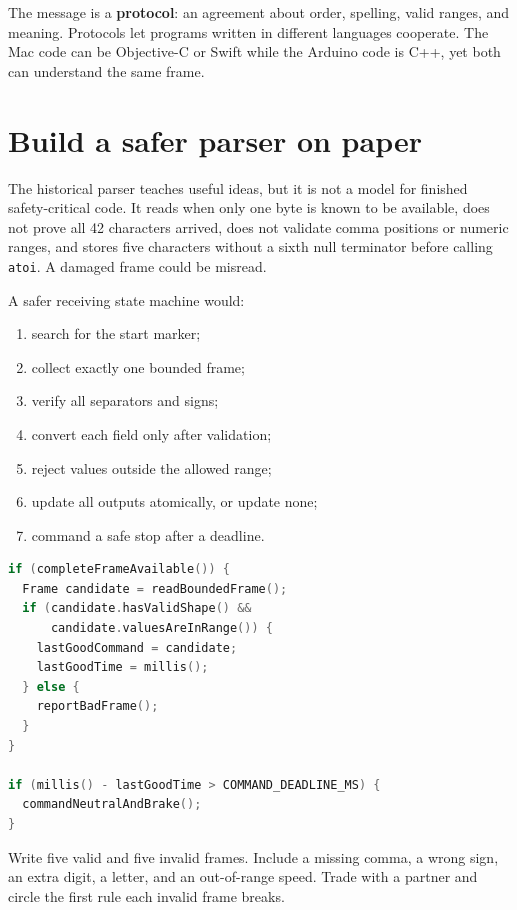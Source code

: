 \documentclass[11pt,openany]{book}
\begin{document}
\begin{conceptbox}
The message is a \textbf{protocol}: an agreement about order, spelling, valid ranges, and meaning. Protocols let programs written in different languages cooperate. The Mac code can be Objective-C or Swift while the Arduino code is C++, yet both can understand the same frame.
\end{conceptbox}

\clearpage
\section*{Build a safer parser on paper}

The historical parser teaches useful ideas, but it is not a model for finished safety-critical code. It reads when only one byte is known to be available, does not prove all 42 characters arrived, does not validate comma positions or numeric ranges, and stores five characters without a sixth null terminator before calling \texttt{atoi}. A damaged frame could be misread.

A safer receiving state machine would:

\begin{enumerate}
  \item search for the start marker;
  \item collect exactly one bounded frame;
  \item verify all separators and signs;
  \item convert each field only after validation;
  \item reject values outside the allowed range;
  \item update all outputs atomically, or update none;
  \item command a safe stop after a deadline.
\end{enumerate}

\begin{lstlisting}[language=C++,caption={Pseudocode for an all-or-nothing command decoder.}]
if (completeFrameAvailable()) {
  Frame candidate = readBoundedFrame();
  if (candidate.hasValidShape() &&
      candidate.valuesAreInRange()) {
    lastGoodCommand = candidate;
    lastGoodTime = millis();
  } else {
    reportBadFrame();
  }
}

if (millis() - lastGoodTime > COMMAND_DEADLINE_MS) {
  commandNeutralAndBrake();
}
\end{lstlisting}

\begin{buildbox}[title={FRAME INSPECTOR}]
Write five valid and five invalid frames. Include a missing comma, a wrong sign, an extra digit, a letter, and an out-of-range speed. Trade with a partner and circle the first rule each invalid frame breaks.
\end{buildbox}
\end{document}
